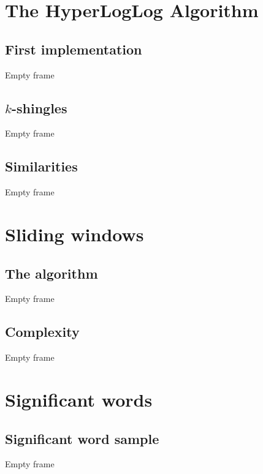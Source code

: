 \documentclass{beamer}
\begin{document}
\section{The HyperLogLog Algorithm}

\subsection{First implementation}
\begin{frame}
Empty frame
\end{frame}

\subsection{$k$-shingles}
\begin{frame}
Empty frame
\end{frame}

\subsection{Similarities}
\begin{frame}
Empty frame
\end{frame}



\section{Sliding windows}

\subsection{The algorithm}
\begin{frame}
Empty frame
\end{frame}

\subsection{Complexity}
\begin{frame}
Empty frame
\end{frame}




\section{Significant words}

\subsection{Significant word sample}
\begin{frame}
Empty frame
\end{frame}
\end{document}
